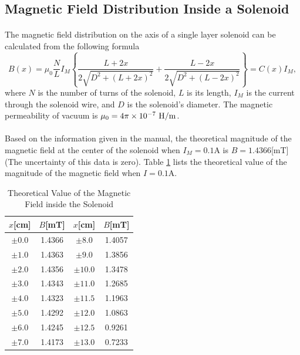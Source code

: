 \documentclass[a4paper]{article}
\begin{document}
    \subsection{Magnetic Field Distribution Inside a Solenoid}\label{sec:inside}
    \paragraph{} The magnetic field distribution on the axis of a single layer solenoid can be calculated from the following formula \begin{equation}
        B(x)=\mu_0\frac{N}{L}I_M\left\{\frac{L+2x}{2\sqrt{D^2+(L+2x)^2}}+\frac{L-2x}{2\sqrt{D^2+(L-2x)^2}}\right\}=C(x)I_M,\label{eqn:BandI}
    \end{equation}
    where $N$ is the number of turns of the solenoid, $L$ is its length, $I_M$ is the current through the solenoid wire, and $D$ is the solenoid's diameter. The magnetic permeability of vacuum is $\mu_0=4\pi\times 10^{-7}\ \rm H/m$.
    \vspace{-5mm}
    \paragraph{} Based on the information given in the manual, the theoretical magnitude of the magnetic field at the center of the solenoid when $I_M=0.1$A is $B=1.4366$[mT](The uncertainty of this data is zero). Table \ref{tab:theoretical} lists the theoretical value of the magnitude of the magnetic field when $I=0.1$A. 
    \begin{table}[H]
        \centering
        \begin{tabular}{|c|c||c|c|}
            \hline
            $x$[cm]&$B$[mT]&$x$[cm]&$B$[mT]\\\hline
            $\pm 0.0$&1.4366&$\pm 8.0$&1.4057\\\hline
            $\pm 1.0$&1.4363&$\pm 9.0$&1.3856\\\hline
            $\pm 2.0$&1.4356&$\pm 10.0$&1.3478\\\hline
            $\pm 3.0$&1.4343&$\pm 11.0$&1.2685\\\hline
            $\pm 4.0$&1.4323&$\pm 11.5$&1.1963\\\hline
            $\pm 5.0$&1.4292&$\pm 12.0$&1.0863\\\hline
            $\pm 6.0$&1.4245&$\pm 12.5$&0.9261\\\hline
            $\pm 7.0$&1.4173&$\pm 13.0$&0.7233\\\hline
        \end{tabular}
        \caption{Theoretical Value of the Magnetic Field inside the Solenoid}
        \label{tab:theoretical}
    \end{table}
\end{document}
